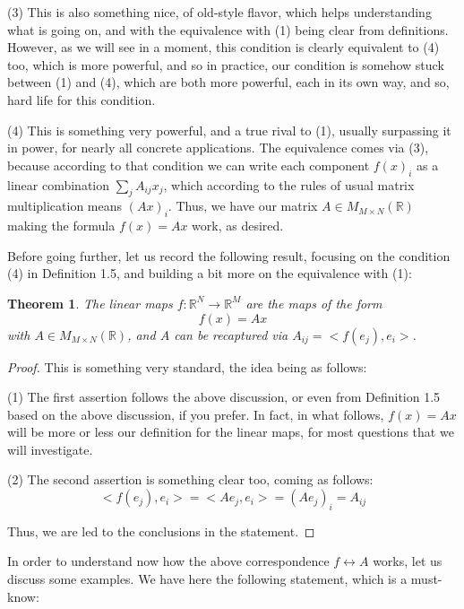 \documentclass[12pt]{amsbook}
\newtheorem{theorem}{Theorem}[chapter]
\begin{document}
\bigskip

(3) This is also something nice, of old-style flavor, which helps understanding what is going on, and with the equivalence with (1) being clear from definitions. However, as we will see in a moment, this condition is clearly equivalent to (4) too, which is more powerful, and so in practice, our condition is somehow stuck between (1) and (4), which are both more powerful, each in its own way, and so, hard life for this condition.

\bigskip

(4) This is something very powerful, and a true rival to (1), usually surpassing it in power, for nearly all concrete applications. The equivalence comes via (3), because according to that condition we can write each component $f(x)_i$ as a linear combination $\sum_jA_{ij}x_j$, which according to the rules of usual matrix multiplication means $(Ax)_i$. Thus, we have our matrix $A\in M_{M\times N}(\mathbb R)$ making the formula $f(x)=Ax$ work, as desired.

\bigskip

Before going further, let us record the following result, focusing on the condition (4) in Definition 1.5, and building a bit more on the equivalence with (1):


\begin{theorem}
The linear maps $f:\mathbb R^N\to\mathbb R^M$ are the maps of the form
$$f(x)=Ax$$
with $A\in M_{M\times N}(\mathbb R)$, and $A$ can be recaptured via $A_{ij}=<f(e_j),e_i>$.
\end{theorem}

\begin{proof}
This is something very standard, the idea being as follows:

\medskip

(1) The first assertion follows the above discussion, or even from Definition 1.5 based on the above discussion, if you prefer. In fact, in what follows, $f(x)=Ax$ will be more or less our definition for the linear maps, for most questions that we will investigate.

\medskip

(2) The second assertion is something clear too, coming as follows:
$$<f(e_j),e_i>
=<Ae_j,e_i>
=(Ae_j)_i
=A_{ij}$$

Thus, we are led to the conclusions in the statement.
\end{proof}

In order to understand now how the above correspondence $f\leftrightarrow A$ works, let us discuss some examples. We have here the following statement, which is a must-know:
\end{document}
